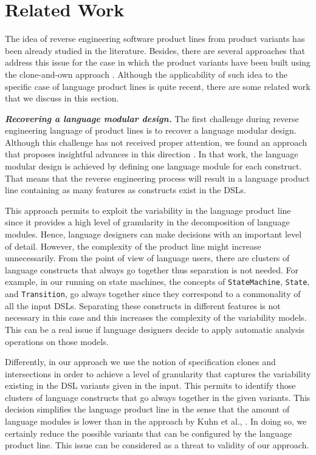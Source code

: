 \section{Related Work}
\label{sec:relatedwork}

The idea of reverse engineering software product lines from product variants has been already studied in the literature. Besides, there are several approaches that address this issue for the case in which the product variants have been built using the clone-and-own approach \cite{LopezHerrejon:2015,Martinez:2015,Martinez:2015b}. Although the applicability of such idea to the specific case of language product lines is quite recent, there are some related work that we discuss in this section. 

\vspace{2mm}
\textbf{\textit{Recovering a language modular design.}} The first challenge during reverse engineering language of product lines is to recover a language modular design. Although this challenge has not received proper attention, we found an approach that proposes insightful advances in this direction \cite{Kuhn:2015}. In that work, the language modular design is achieved by defining one language module for each construct. That means that the reverse engineering process will result in a language product line containing as many features as constructs exist in the DSLs.

This approach permits to exploit the variability in the language product line since it provides a high level of granularity in the decomposition of language modules. Hence, language designers can make decisions with an important level of detail. However, the complexity of the product line might increase unnecessarily. From the point of view of language users, there are clusters of language constructs that always go together thus separation is not needed. For example, in our running on state machines, the concepts of \texttt{StateMachine}, \texttt{State}, and \texttt{Transition}, go always together since they correspond to a commonality of all the input DSLs. Separating these constructs in different features is not necessary in this case and this increases the complexity of the variability models. This can be a real issue if language designers decide to apply automatic analysis operations on those models.

Differently, in our approach we use the notion of specification clones and intersections in order to achieve a level of granularity that captures the variability existing in the DSL variants given in the input. This permits to identify those clusters of language constructs that go always together in the given variants. This decision simplifies the language product line in the sense that the amount of language modules is lower than in the approach by Kuhn et al., \cite{Kuhn:2015}. In doing so, we certainly reduce the possible variants that can be configured by the language product line. This issue can be considered as a threat to validity of our approach. 

